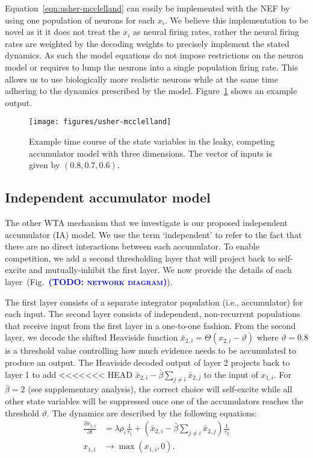 \documentclass[10pt,letterpaper]{article}
\makeatletter
\newcommand{\todo}[1]{\textbf{\textsc{\textcolor{blue}{(TODO\@: #1)}}}}
\makeatother
\begin{document}
Equation~\ref{eqn:usher-mcclelland} can easily be implemented with the NEF by 
using one population of neurons for each $x_i$.  We believe this implementation 
to be novel as it it does not treat the $x_i$ as neural firing rates, rather the 
neural firing rates are weighted by the decoding weights to precisely implement 
the stated dynamics. As such the model equations do not impose restrictions on 
the neuron model or requires to lump the neurons into a single population firing 
rate. This allows us to use biologically more realistic neurons while at the 
same time adhering to the dynamics prescribed by the model.  
Figure~\ref{fig:usher-mcclelland} shows an example output.
\begin{figure}
    \centering
    \texttt{[image: figures/usher-mcclelland]}
    \caption{Example time course of the state variables in the leaky, competing 
        accumulator model with three dimensions. The vector of inputs is given 
        by $(0.8, 0.7, 0.6)$.}\label{fig:usher-mcclelland}
\end{figure}

\subsection{Independent accumulator model}
The other WTA mechanism that we investigate is our proposed independent accumulator (IA) model.
We use the term `independent' to refer to the fact that there are no direct interactions between each accumulator.
To enable competition, we add a second thresholding layer that will project back to self-excite and mutually-inhibit the first layer.
We now provide the details of each layer~(Fig.~\todo{network diagram}).

The first layer consists of a separate integrator population (i.e., accumulator) for each input.
The second layer consists of independent, non-recurrent populations that receive input from the 
first layer in a one-to-one fashion.
From the second layer, we decode the shifted Heaviside function 
$\bar{x}_{2,i} = \Theta(x_{2,i} - \vartheta)$ where $\vartheta = 0.8$ is 
a threshold value controlling how much evidence needs to be accumulated to produce an output.
The Heaviside decoded output of layer 2 projects back to layer 1 to add 
<<<<<<< HEAD
$\bar{x}_{2,i} - \bar{\beta} \sum_{j \neq i} \bar{x}_{2,j}$ to the input of $x_{1,i}$.
For $\bar{\beta} = 2$ (see supplementary analysis), the correct choice will self-excite while all other state variables will be 
suppressed once one of the accumulators reaches the threshold $\vartheta$.  The 
dynamics are described by the following equations:
\begin{equation}
    \begin{split}
        \frac{{\partial x}_{1,i}}{\partial t} &= \lambda \rho_i \frac{1}{\tau_1} + \left( 
            \bar{x}_{2,i} - \bar{\beta} \sum_{j \neq i} \bar{x}_{2,j} \right) \frac{1}{\tau_2} \\
        x_{1,i} &\rightarrow \max(x_{1,i}, 0) .
    \end{split}
\end{equation}
\end{document}
